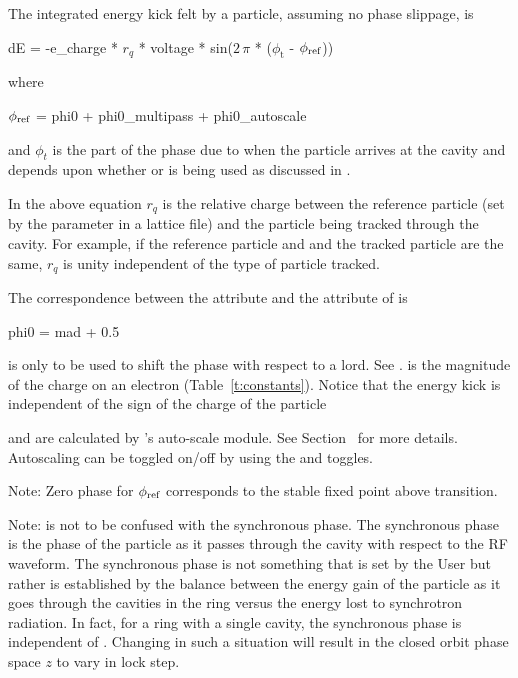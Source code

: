 {The integrated energy kick felt by a particle, assuming no phase slippage, is 
\begin{example}
  dE = -e_charge * \(r_q\) * voltage * sin(\(2\,\pi\) * (\(\phi_\text{t}\) - \(\phi_{\text{ref}}\)))
\end{example}
where
\begin{example}
  \(\phi_{\text{ref}}\) = phi0 + phi0_multipass + phi0_autoscale
  \label{rfcav.phi}
\end{example}
and $\phi_t$ is the part of the phase due to when the particle arrives at the cavity and depends
upon whether  or  is being used as discussed
in .

In the above equation $r_q$ is the relative charge between the reference particle (set by the
 parameter in a lattice file) and the particle being tracked through the
cavity. For example, if the reference particle and and the tracked particle are the same, $r_q$ is
unity independent of the type of particle tracked.

The correspondence between the \bmad {} attribute and the  attribute of
\mad is
\begin{example}
  phi0 = mad + 0.5
\end{example}

 is only to be used to shift the phase with respect to a  lord. See
.  is the magnitude of the charge on an electron
(Table~\ref{t:constants}). Notice that the energy kick is independent of the sign of the charge of
the particle

 and  are calculated by \bmad's auto-scale module. See
Section~ for more details. Autoscaling can be toggled on/off by using the
 and  toggles.

Note: Zero phase for $\phi_{\text{ref}}$ corresponds to the stable fixed point above transition.

Note:  is not to be confused with the synchronous phase. The synchronous phase is the phase
of the particle as it passes through the cavity with respect to the RF waveform. The synchronous
phase is not something that is set by the User but rather is established by the balance between the
energy gain of the particle as it goes through the cavities in the ring versus the energy lost to
synchrotron radiation. In fact, for a ring with a single cavity, the synchronous phase is independent
of . Changing  in such a situation will result in the closed orbit phase space $z$ to
vary in lock step.

}
